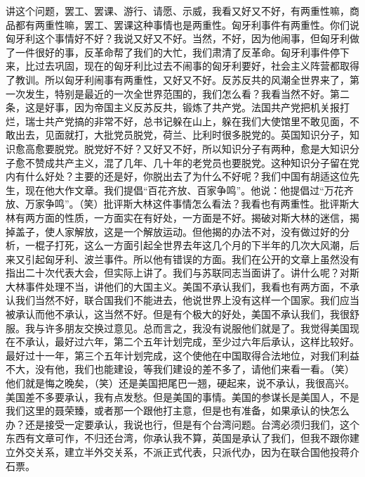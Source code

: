 讲这个问题，罢工、罢课、游行、请愿、示威，我看又好又不好，有两重性嘛，商品都有两重性嘛，罢工、罢课这种事情也是两重性。匈牙利事件有两重性。你们说匈牙利这个事情好不好？我说又好又不好。当然，不好，因为他闹事，但匈牙利做了一件很好的事，反革命帮了我们的大忙，我们肃清了反革命。匈牙利事件停下来，比过去巩固，现在的匈牙利比过去不闹事的匈牙利要好，社会主义阵营都取得了教训。所以匈牙利闹事有两重性，又好又不好。反苏反共的风潮全世界来了，第一次发生，特别是最近的一次全世界范围的，我们怎么看？我看当然不好。第二条，这是好事，因为帝国主义反苏反共，锻炼了共产党。法国共产党把机关报打烂，瑞士共产党搞的非常不好，总书记躲在山上，躲在我们大使馆里不敢见面，不敢出去，见面就打，大批党员脱党，荷兰、比利时很多脱党的。英国知识分子，知识愈高愈要脱党。脱党好不好？又好又不好，所以知识分子有两种，愈是大知识分子愈不赞成共产主义，混了几年、几十年的老党员也要脱党。这种知识分子留在党内有什么好处？主要的还是好，你脱出去了为什么不好呢？我们中国有胡适这位先生，现在他大作文章。我们提倡“百花齐放、百家争鸣”。他说：他提倡过“万花齐放、万家争鸣”。（笑）批评斯大林这件事情怎么看法？我看也有两重性。批评斯大林有两方面的性质，一方面实在有好处，一方面是不好。揭破对斯大林的迷信，揭掉盖子，使人家解放，这是一个解放运动。但他揭的办法不对，没有做过好的分析，一棍子打死，这么一方面引起全世界去年这几个月的下半年的几次大风潮，后来又引起匈牙利、波兰事件。所以他有错误的方面。我们在公开的文章上虽然没有指出二十次代表大会，但实际上讲了。我们与苏联同志当面讲了。讲什么呢？对斯大林事件处理不当，讲他们的大国主义。美国不承认我们，我看也有两方面，不承认我们当然不好，联合国我们不能进去，他说世界上没有这样一个国家。我们应当被承认而他不承认，这当然不好。但是有个极大的好处，美国不承认我们，我很舒服。我与许多朋友交换过意见。总而言之，我没有说服他们就是了。我觉得美国现在不承认，最好过六年，第二个五年计划完成，至少过六年后承认，这样比较好。最好过十一年，第三个五年计划完成，这个使他在中国取得合法地位，对我们利益不大，没有他，我们也能建设，等我们建设的差不多了，请他们来看一看。（笑）他们就是悔之晚矣，（笑）还是美国把尾巴一翘，硬起来，说不承认，我很高兴。美国差不多要承认，我有点发愁。但是美国的事情。美国的参谋长是美国人，不是我们这里的聂荣臻，或者那一个跟他打主意，但是也有准备，如果承认的快怎么办？还是接受一定要承认，我说也行，但是有个台湾问题。台湾必须归我们，这个东西有文章可作，不归还台湾，你承认我不算，英国是承认了我们，但我不跟你建立外交关系，建立半外交关系，不派正式代表，只派代办，因为在联合国他投蒋介石票。

